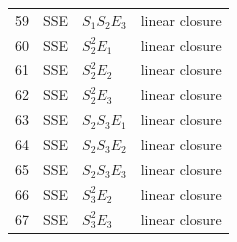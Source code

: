 \begin{longtable}{@{}rlll@{}}
59 & SSE & $S_1S_2E_3$ & linear closure \\
60 & SSE & $S_2^{2}E_1$ & linear closure \\
61 & SSE & $S_2^{2}E_2$ & linear closure \\
62 & SSE & $S_2^{2}E_3$ & linear closure \\
63 & SSE & $S_2S_3E_1$ & linear closure \\
64 & SSE & $S_2S_3E_2$ & linear closure \\
65 & SSE & $S_2S_3E_3$ & linear closure \\
66 & SSE & $S_3^{2}E_2$ & linear closure \\
67 & SSE & $S_3^{2}E_3$ & linear closure \\
\bottomrule
\end{longtable}

